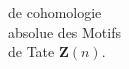 
\begin{flushright}
 de cohomologie\\
absolue des Motifs\\
de Tate $\mathbf Z(n)$.
\end{flushright}

